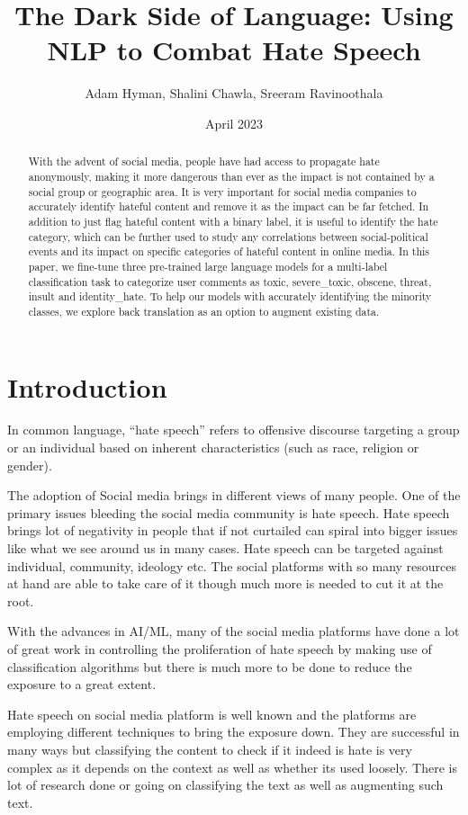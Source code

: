 \documentclass[11pt,a4paper]{article}
\title{The Dark Side of Language: Using NLP to Combat Hate Speech}
\author{ 
  Adam Hyman, 
  Shalini Chawla,
  Sreeram Ravinoothala \\
  }
\date{April 2023}
\begin{document}
\maketitle
\begin{abstract}
With the advent of social media, people have had access to propagate hate anonymously, making it more dangerous than ever as the impact is not contained by a social group or geographic area. It is very important for social media companies to accurately identify hateful content and remove it as the impact can be far fetched. In addition to just flag hateful content with a binary label, it is useful to identify the hate category, which can be further used to study any correlations between social-political events and its impact on specific categories of hateful content in online media. In this paper, we fine-tune three pre-trained large language models for a multi-label classification task to categorize user comments as toxic, severe\_toxic, obscene, threat, insult and identity\_hate. To help our models with accurately identifying the minority classes, we explore back translation as an option to augment existing data.

\end{abstract}

\section{Introduction}

In common language, “hate speech” refers to offensive discourse targeting a group or an individual based on inherent characteristics (such as race, religion or gender).

The adoption of Social media brings in different views of many people. One of the primary issues bleeding the social media community is hate speech. Hate speech brings lot of negativity in people that if not curtailed can spiral into bigger issues like what we see around us in many cases. Hate speech can be targeted against individual, community, ideology etc. The social platforms with so many resources at hand are able to take care of it though much more is needed to cut it at the root.

With the advances in AI/ML, many of the social media platforms have done a lot of great work in controlling the proliferation of hate speech by making use of classification algorithms but there is much more to be done to reduce the exposure to a great extent.

Hate speech on social media platform is well known and the platforms are employing different techniques to bring the exposure down. They are successful in many ways but classifying the content to check if it indeed is hate is very complex as it depends on the context as well as whether its used loosely. There is lot of research done or going on classifying the text as well as augmenting such text.
\end{document}

